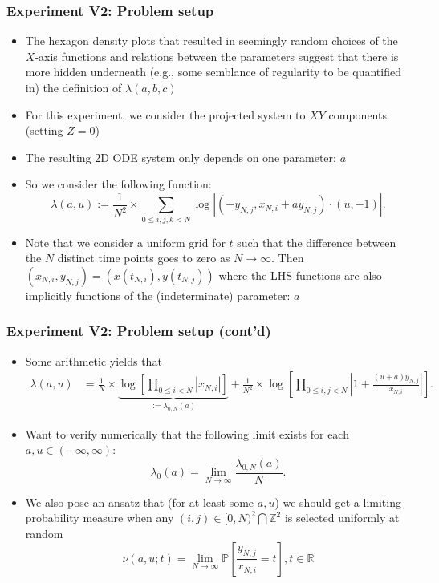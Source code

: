 \documentclass[usenames,svgnames,dvipsnames,10pt]{beamer}
\begin{document}
\begin{frame}
\frametitle{Experiment V2: Problem setup}

\begin{itemize} 

\item The hexagon density plots that resulted in seemingly random choices of the $X$-axis functions 
      and relations between the parameters suggest that there is more hidden underneath 
      (e.g., some semblance of regularity to be quantified in) the definition of 
      $\lambda(a, b, c)$ 
\item For this experiment, we consider the projected system to $XY$ components (setting $Z=0$) 
\item The resulting 2D ODE system only depends on one parameter: $a$ 
\item So we consider the following function: 
      \[
      \lambda(a, u) := \frac{1}{N^2} \times \sum_{0 \leq i, j, k < N} \log\left\lvert 
      (-y_{N,j}, x_{N,i}+ay_{N,j}) \cdot (u, -1)\right\rvert. 
      \]
\item Note that we consider a uniform grid for $t$ such that the difference between the 
      $N$ distinct time points goes to zero as $N \rightarrow \infty$. Then 
      $(x_{N,i}, y_{N,j}) = (x(t_{N,i}), y(t_{N,j}))$ where the LHS functions are also implicitly functions 
      of the (indeterminate) parameter: $a$
\end{itemize}

\end{frame}

\begin{frame}
\frametitle{Experiment V2: Problem setup (cont'd)}

\begin{itemize} 

\item Some arithmetic yields that 
      \begin{align*}
      \lambda(a, u) & = \frac{1}{N} \times 
           \underset{ := \lambda_{0,N}(a)}{\underbrace{\log\left[\prod_{0 \leq i < N} |x_{N,i}|\right]}} + 
           \frac{1}{N^2} \times \log\left[\prod_{0 \leq i,j < N} \left\lvert 1 + 
           \frac{(u+a)y_{N,j}}{x_{N,i}}\right\rvert\right]. 
      \end{align*}
\item Want to verify numerically that the following limit exists for each $a, u \in (-\infty, \infty)$:  
      \[
      \lambda_0(a) = \lim_{N \rightarrow \infty} \frac{\lambda_{0,N}(a)}{N}. 
      \]
\item We also pose an ansatz that (for at least some $a,u$) we should get a limiting probability 
      measure when any $(i, j) \in [0, N)^2 \bigcap \mathbb{Z}^2$ is selected uniformly at random 
      \[
      \nu(a, u; t) = \lim_{N \rightarrow \infty} \mathbb{P}\left[\frac{y_{N,j}}{x_{N,i}} = t\right], t \in \mathbb{R}
      \]

\end{itemize} 

\end{frame}
\end{document}
